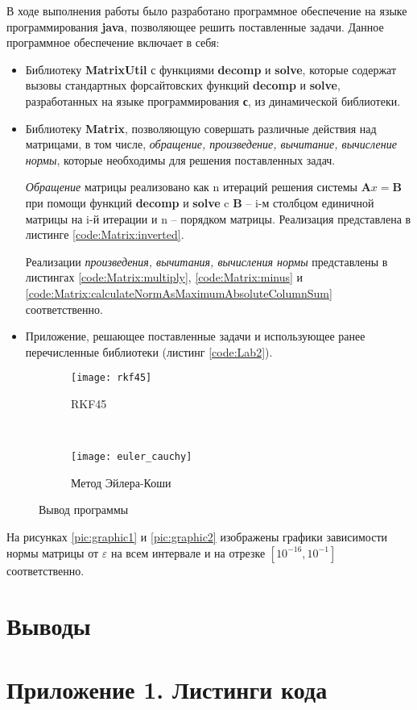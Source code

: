 В ходе выполнения работы было разработано программное обеспечение на языке программирования \textbf{java}, позволяющее решить поставленные задачи. Данное программное обеспечение включает в себя:
\begin{itemize}

\item Библиотеку \textbf{MatrixUtil} с функциями \textbf{decomp} и \textbf{solve}, которые содержат вызовы стандартных форсайтовских функций \textbf{decomp} и \textbf{solve}, разработанных на языке программирования \textbf{с}, из динамической библиотеки.

\item Библиотеку \textbf{Matrix}, позволяющую совершать различные действия над матрицами, в том числе, \textit{обращение, произведение, вычитание, вычисление нормы}, которые необходимы для решения поставленных задач.

 \textit{Обращение} матрицы реализовано как n итераций решения системы $\textbf{A}x = \textbf{B}$ при помощи функций \textbf{decomp} и \textbf{solve} c $\textbf{B}$ -- i-м столбцом единичной матрицы на i-й итерации и n -- порядком матрицы. Реализация представлена в листинге \ref{code:Matrix:inverted}.
 
 Реализации \textit{произведения, вычитания, вычисления нормы} представлены в листингах \ref{code:Matrix:multiply}, \ref{code:Matrix:minus} и \ref{code:Matrix:calculateNormAsMaximumAbsoluteColumnSum} соответственно.

\item Приложение, решающее поставленные задачи и использующее ранее перечисленные библиотеки (листинг \ref{code:Lab2}).

\end{itemize} 

\begin{figure}[H]
    \centering
    \begin{subfigure}[t]{0.5\textwidth}
        \centering
        \texttt{[image: rkf45]}
        \caption{RKF45}
    \end{subfigure}%
    ~ 
    \begin{subfigure}[t]{0.5\textwidth}
        \centering
        \texttt{[image: euler\_cauchy]}
        \caption{Метод Эйлера-Коши}
    \end{subfigure}
    \caption{Вывод программы}
    \label{pic:demo1}
\end{figure} 

На рисунках \ref{pic:graphic1} и \ref{pic:graphic2} изображены графики зависимости нормы матрицы от $\varepsilon$ на всем интервале и на отрезке $[10^{-16}, 10^{-1}]$ соответственно.

\section{Выводы}

\newpage

\section*{Приложение 1. Листинги кода}


